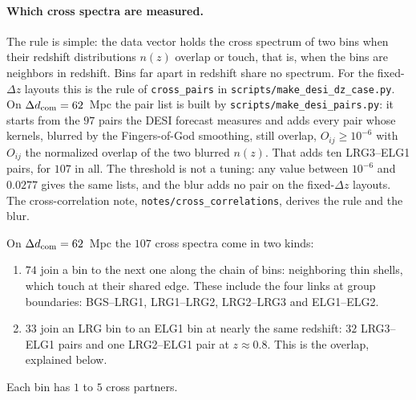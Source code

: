 \documentclass[11pt]{article}
\newcommand{\us}{\_\allowbreak}
\begin{document}
\paragraph{Which cross spectra are measured.}
The rule is simple: the data vector holds the cross spectrum of two bins
when their redshift distributions $n(z)$ overlap or touch, that is, when
the bins are neighbors in redshift.  Bins far apart in redshift share no
spectrum.  For the fixed-$\Delta z$ layouts this is the rule of
\texttt{cross\us pairs} in \texttt{scripts/make\us desi\us dz\us case.py}.
On $\Delta d_{\rm com} = 62$~Mpc the pair list is built by
\texttt{scripts/make\us desi\us pairs.py}: it starts from the $97$ pairs
the DESI forecast measures and adds every pair whose kernels, blurred by
the Fingers-of-God smoothing, still overlap, $O_{ij} \ge 10^{-6}$ with
$O_{ij}$ the normalized overlap of the two blurred $n(z)$.  That adds
ten LRG3--ELG1 pairs, for $107$ in all.  The threshold is not a tuning:
any value between $10^{-6}$ and $0.0277$ gives the same lists, and the
blur adds no pair on the fixed-$\Delta z$ layouts.  The
cross-correlation note, \texttt{notes/cross\us correlations}, derives
the rule and the blur.

On $\Delta d_{\rm com} = 62$~Mpc the $107$ cross spectra come in two
kinds:
\begin{enumerate}
  \item $74$ join a bin to the next one along the chain of bins:
    neighboring thin shells, which touch at their shared edge.  These
    include the four links at group boundaries: BGS--LRG1, LRG1--LRG2,
    LRG2--LRG3 and ELG1--ELG2.
  \item $33$ join an LRG bin to an ELG1 bin at nearly the same redshift:
    $32$ LRG3--ELG1 pairs and one LRG2--ELG1 pair at $z \approx 0.8$.
    This is the overlap, explained below.
\end{enumerate}
Each bin has $1$ to $5$ cross partners.
\end{document}
